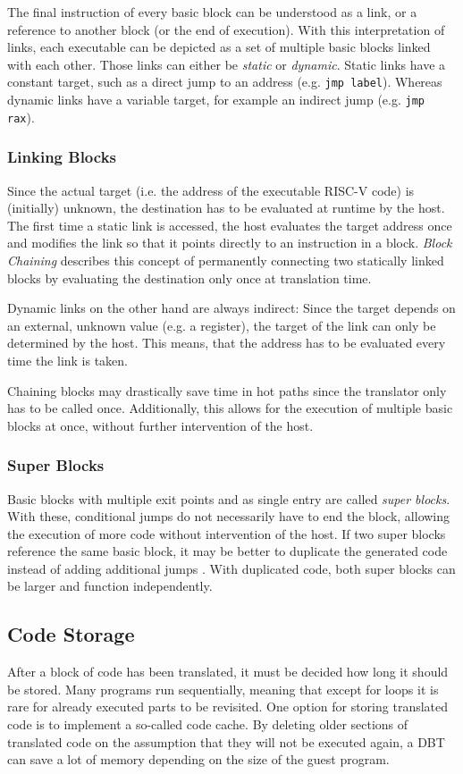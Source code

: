 		The final instruction of every basic block can be understood as a link, or a reference to another block (or the end of execution). With this interpretation of links, each executable can be depicted as a set of multiple basic blocks linked with each other. Those links can either be \emph{static}  or \emph{dynamic}. Static links have a constant target, such as a direct jump to an address (e.g. \texttt{jmp label}). Whereas dynamic links have a variable target, for example an indirect jump (e.g. \texttt{jmp rax}).
		
	\subsubsection{Linking Blocks}
	\label{Block Chaining}
		Since the actual target (i.e. the address of the executable RISC-V code) is (initially) unknown, the destination has to be evaluated at runtime by the host. The first time a static link is accessed, the host evaluates the target address once and modifies the link so that it points directly to an instruction in a block. \emph{Block Chaining} describes this concept of permanently connecting two statically linked blocks by evaluating the destination only once at translation time.
	
		Dynamic links on the other hand are always indirect: Since the target depends on an external, unknown value (e.g. a register), the target of the link can only be determined by the host. This means, that the address has to be evaluated every time the link is taken.
		
		Chaining blocks may drastically save time in hot paths since the translator only has to be called once. Additionally, this allows for the execution of multiple basic blocks at once, without further intervention of the host.
		
	\subsubsection{Super Blocks}
	Basic blocks with multiple exit points and as single entry are called \emph{super blocks}. With these, conditional jumps do not necessarily have to end the block, allowing the execution of more code without intervention of the host. If two super blocks reference the same basic block, it may be better to duplicate the generated code instead of adding additional jumps \cite{smith2005virtual}. With duplicated code, both super blocks can be larger and function independently.

\subsection{Code Storage}
\label{code storage}
After a block of code has been translated, it must be decided how long it should be stored. Many programs run sequentially, meaning that except for loops it is rare for already executed parts to be revisited. One option for storing translated code is to implement a so-called code cache. By deleting older sections of translated code on the assumption that they will not be executed again, a DBT can save a lot of memory depending on the size of the guest program.

